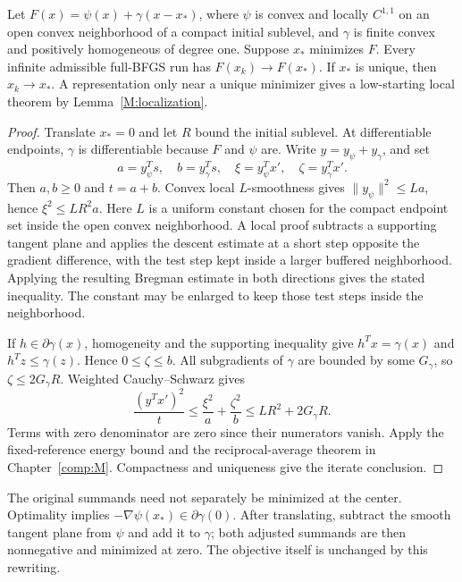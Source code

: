 \begin{theorem}\label{F:centered}
Let $F(x)=\psi(x)+\gamma(x-x_*)$, where $\psi$ is convex and locally $C^{1,1}$ on an open convex neighborhood of a compact initial sublevel, and $\gamma$ is finite convex and positively homogeneous of degree one. Suppose $x_*$ minimizes $F$. Every infinite admissible full-BFGS run has $F(x_k)\to F(x_*)$. If $x_*$ is unique, then $x_k\to x_*$. A representation only near a unique minimizer gives a low-starting local theorem by Lemma~\ref{M:localization}.
\end{theorem}
\begin{proof}
Translate $x_*=0$ and let $R$ bound the initial sublevel. At differentiable endpoints, $\gamma$ is differentiable because $F$ and $\psi$ are. Write $y=y_\psi+y_\gamma$, and set
\[
 a=y_\psi^Ts,\quad b=y_\gamma^Ts,\quad
 \xi=y_\psi^Tx',\quad\zeta=y_\gamma^Tx'.
\]
Then $a,b\ge0$ and $t=a+b$. Convex local $L$-smoothness gives $\|y_\psi\|^2\le La$, hence $\xi^2\le LR^2a$. Here $L$ is a uniform constant chosen for the compact endpoint set inside the open convex neighborhood. A local proof subtracts a supporting tangent plane and applies the descent estimate at a short step opposite the gradient difference, with the test step kept inside a larger buffered neighborhood. Applying the resulting Bregman estimate in both directions gives the stated inequality. The constant may be enlarged to keep those test steps inside the neighborhood.

If $h\in\partial\gamma(x)$, homogeneity and the supporting inequality give $h^Tx=\gamma(x)$ and $h^Tz\le\gamma(z)$. Hence $0\le\zeta\le b$. All subgradients of $\gamma$ are bounded by some $G_\gamma$, so $\zeta\le2G_\gamma R$. Weighted Cauchy--Schwarz gives
\[
 \frac{(y^Tx')^2}{t}
 \le\frac{\xi^2}{a}+\frac{\zeta^2}{b}
 \le LR^2+2G_\gamma R.
\]
Terms with zero denominator are zero since their numerators vanish. Apply the fixed-reference energy bound and the reciprocal-average theorem in Chapter~\ref{comp:M}. Compactness and uniqueness give the iterate conclusion.
\end{proof}
The original summands need not separately be minimized at the center. Optimality implies $-\nabla\psi(x_*)\in\partial\gamma(0)$. After translating, subtract the smooth tangent plane from $\psi$ and add it to $\gamma$; both adjusted summands are then nonnegative and minimized at zero. The objective itself is unchanged by this rewriting.



